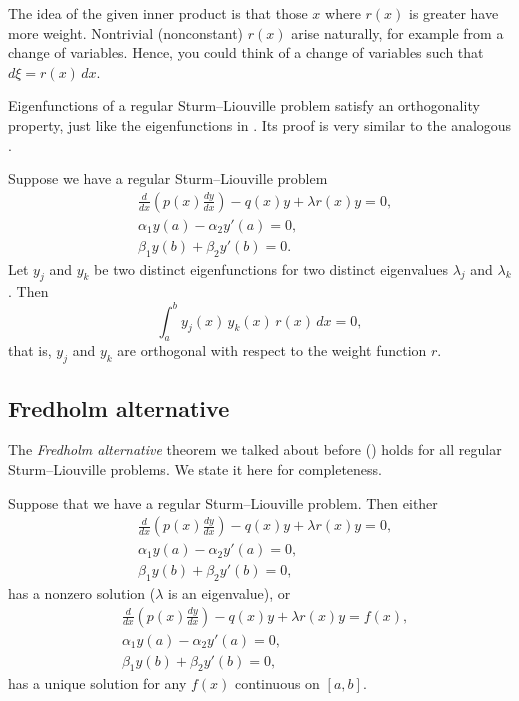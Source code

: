 The idea of the given inner product is that those $x$ where $r(x)$
is greater have more weight.
Nontrivial (nonconstant)
$r(x)$ arise naturally, for example from a change of variables.
Hence, you could
think of a change of variables such that $d\xi = r(x)\, dx$.

Eigenfunctions of a
regular Sturm--Liouville problem satisfy an orthogonality property, just
like the eigenfunctions in .
Its proof is very similar to the analogous 
.

\begin{theorem}
Suppose we have a regular Sturm--Liouville problem
\begin{align*}
&\frac{d}{dx} \left( p(x) \frac{dy}{dx} \right)
- q(x) y + \lambda r(x) y = 0 , \\
&\alpha_1 y(a) - \alpha_2 y'(a) = 0 , \\
&\beta_1 y(b) + \beta_2 y'(b) = 0 .
\end{align*}
Let $y_j$ and $y_k$ be two distinct eigenfunctions for two
distinct eigenvalues $\lambda_j$ and $\lambda_k$.  Then
\begin{equation*}
\int_a^b y_j(x) \, y_k(x) \, r(x) \,dx = 0,
\end{equation*}
that is, $y_j$ and $y_k$ are orthogonal with respect to the weight function
$r$.
\end{theorem}


\subsection{Fredholm alternative}

The \emph{Fredholm alternative} theorem we talked about before
()
holds for all regular Sturm--Liouville problems.
We state it here for completeness.

\begin{theorem}%
Suppose that we have a regular Sturm--Liouville problem.
Then either
\begin{align*}
&\frac{d}{dx} \left( p(x) \frac{dy}{dx} \right)
- q(x) y + \lambda r(x) y = 0 , \\
&\alpha_1 y(a) - \alpha_2 y'(a) = 0 , \\
&\beta_1 y(b) + \beta_2 y'(b) = 0 ,
\end{align*}
has a nonzero solution ($\lambda$ is an eigenvalue), or
\begin{align*}
&\frac{d}{dx} \left( p(x) \frac{dy}{dx} \right)
- q(x) y + \lambda r(x) y = f(x) , \\
&\alpha_1 y(a) - \alpha_2 y'(a) = 0 , \\
&\beta_1 y(b) + \beta_2 y'(b) = 0 ,
\end{align*}
has a unique solution for any $f(x)$ continuous on $[a,b]$.
\end{theorem}

